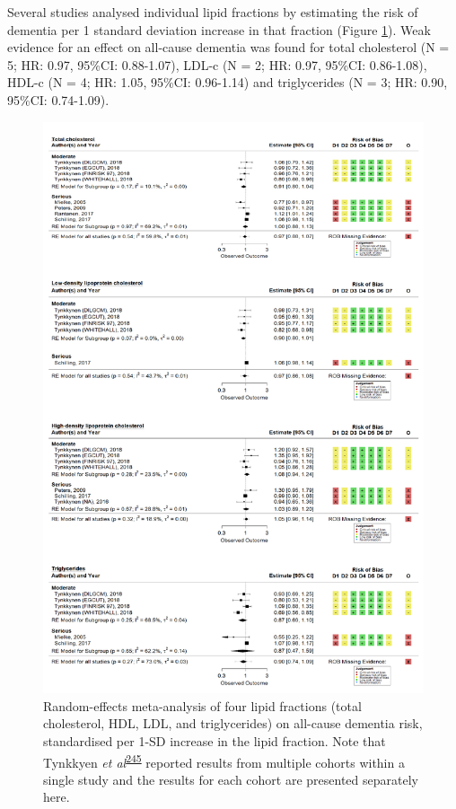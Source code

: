 \documentclass[a4paper, twoside]{templates/ociamthesis}
\begin{document}
Several studies analysed individual lipid fractions by estimating the risk of dementia per 1 standard deviation increase in that fraction (Figure \ref{fig:lipidFractionsDementia}). Weak evidence for an effect on all-cause dementia was found for total cholesterol (N = 5; HR: 0.97, 95\%CI: 0.88-1.07), LDL-c (N = 2; HR: 0.97, 95\%CI: 0.86-1.08), HDL-c (N = 4; HR: 1.05, 95\%CI: 0.96-1.14) and triglycerides (N = 3; HR: 0.90, 95\%CI: 0.74-1.09).





\begin{figure}[H]
\includegraphics[width=1\linewidth]{figures/sys-rev/fp_lipids_composite_Dementia} \caption[Random-effects meta-analysis of four lipid fractions on all-cause dementia]{Random-effects meta-analysis of four lipid fractions (total cholesterol, HDL, LDL, and triglycerides) on all-cause dementia risk, standardised per 1-SD increase in the lipid fraction. Note that Tynkkyen \emph{et al}\textsuperscript{\protect\hyperlink{ref-tynkkynen2018}{245}} reported results from multiple cohorts within a single study and the results for each cohort are presented separately here.}\label{fig:lipidFractionsDementia}
\end{figure}
\end{document}
